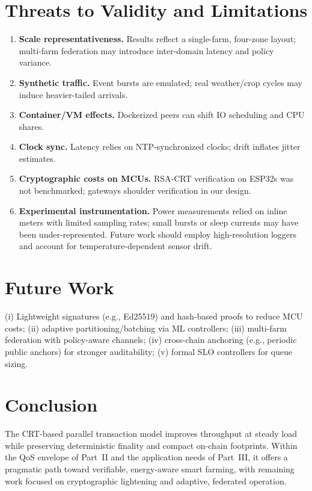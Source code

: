 \section{Threats to Validity and Limitations}
\begin{enumerate}
  \item \textbf{Scale representativeness.} Results reflect a single-farm, four-zone layout; multi-farm federation may introduce inter-domain latency and policy variance.
  \item \textbf{Synthetic traffic.} Event bursts are emulated; real weather/crop cycles may induce heavier-tailed arrivals.
  \item \textbf{Container/VM effects.} Dockerized peers can shift IO scheduling and CPU shares.
  \item \textbf{Clock sync.} Latency relies on NTP-synchronized clocks; drift inflates jitter estimates.
  \item \textbf{Cryptographic costs on MCUs.} RSA-CRT verification on ESP32s was not benchmarked; gateways shoulder verification in our design.
  \item \textbf{Experimental instrumentation.} Power measurements relied on inline meters with limited sampling rates; small bursts or sleep currents may have been under-represented.  Future work should employ high-resolution loggers and account for temperature-dependent sensor drift.
\end{enumerate}

\section{Future Work}
(i) Lightweight signatures (e.g., Ed25519) and hash-based proofs to reduce MCU costs; (ii) adaptive partitioning/batching via ML controllers; (iii) multi-farm federation with policy-aware channels; (iv) cross-chain anchoring (e.g., periodic public anchors) for stronger auditability; (v) formal SLO controllers for queue sizing.

\section{Conclusion}
The CRT-based parallel transaction model improves throughput at steady load while preserving deterministic finality and compact on-chain footprints. Within the QoS envelope of Part~II and the application needs of Part~III, it offers a pragmatic path toward verifiable, energy-aware smart farming, with remaining work focused on cryptographic lightening and adaptive, federated operation.


